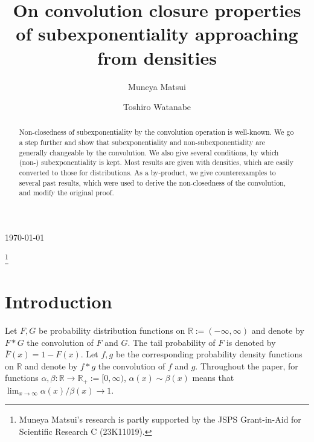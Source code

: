 \documentclass[12pt,leqno]{amsart}
\newcommand{\R}{\mathbb{R}}
\newcommand{\ov}{\overline}
\newcommand{\1}{{\mathbf 1}}
\begin{document}
\today

\title[On convolution closure properties of subexponentiality]
{On convolution closure properties of subexponentiality approaching from densities}
\thanks{Muneya Matsui's research is partly supported by the JSPS Grant-in-Aid for Scientific Research C
(23K11019). 
}
\author[M. Matsui]{Muneya Matsui}
\address{Department of Business Administration, Nanzan University, 18
Yamazato-cho, Showa-ku, Nagoya 466-8673, Japan.}
\author[T. Watanabe]{Toshiro Watanabe}
\address{Center for Mathematical Sciences, The University of Aizu, 
Ikkimachi Tsuruga, Aizu-Wakamatsu, Fukushima, 965-8580, Japan.
}

\begin{abstract}
Non-closedness of subexponentiality by the convolution operation is well-known. 
We go a step further and show that subexponentiality and non-subexponentiality 
are generally changeable by the convolution. 
We also give several conditions, by which (non-) subexponentiality is kept.   
Most results are given with densities, which are easily converted to those for distributions. 
As a by-product, we give counterexamples to several past results, which were used to derive the 
non-closedness of the convolution, and modify the original proof. 
\end{abstract}
\maketitle


\section{Introduction}
Let $F,G$ be probability distribution functions on $\R:=(-\infty,\infty)$ and denote by $F\ast G$ the convolution of $F$ and $G$. 
The tail probability of $F$ is denoted by $\ov F(x)=1-F(x)$. 
Let $f,g$ be the corresponding probability density functions on $\R$ and 
denote by $f\ast g$ the convolution of $f$ and $g$. 
Throughout the paper, 
for functions $\alpha,\beta:\R \to \R_+:=[0,\infty)$, $\alpha(x) \sim \beta(x)$ 
means that $\lim_{x\to\infty}\alpha(x)/\beta(x)\to 1$. 
\end{document}
